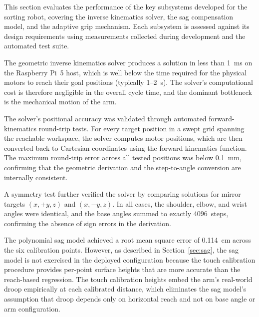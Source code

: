 \label{sec:performance-evaluation}

This section evaluates the performance of the key subsystems
developed for the sorting robot, covering the inverse kinematics
solver, the sag compensation model, and the adaptive grip
mechanism. Each subsystem is assessed against its design
requirements using measurements collected during development and
the automated test suite.


The geometric inverse kinematics solver produces a solution in
less than 1~ms on the Raspberry Pi~5 host, which is well below
the time required for the physical motors to reach their goal
positions (typically 1--2~s). The solver's computational cost is
therefore negligible in the overall cycle time, and the dominant
bottleneck is the mechanical motion of the arm.

The solver's positional accuracy was validated through automated
forward-kinematics round-trip tests. For every target position
in a swept grid spanning the reachable workspace, the solver
computes motor positions, which are then converted back to
Cartesian coordinates using the forward kinematics function.
The maximum round-trip error across all tested positions was
below 0.1~mm, confirming that the geometric derivation and the
step-to-angle conversion are internally consistent.

A symmetry test further verified the solver by comparing
solutions for mirror targets $(x, +y, z)$ and $(x, -y, z)$.
In all cases, the shoulder, elbow, and wrist angles were
identical, and the base angles summed to exactly 4096~steps,
confirming the absence of sign errors in the derivation.


The polynomial sag model achieved a root mean square error of
0.114~cm across the six calibration points. However, as
described in Section~\ref{sec:sag}, the sag model is not exercised in
the deployed configuration because the touch calibration
procedure provides per-point surface heights that are more
accurate than the reach-based regression. The touch calibration
heights embed the arm's real-world droop empirically at each
calibrated distance, which eliminates the sag model's
assumption that droop depends only on horizontal reach and not
on base angle or arm configuration.



